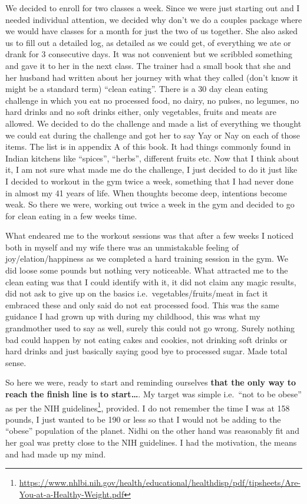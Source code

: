 \documentclass[
  oneside]{book}
\DeclareRobustCommand{\href}[2]{#2\footnote{\url{#1}}}
\begin{document}
We decided to enroll for two classes a week. Since we were just starting out and I needed individual attention, we decided why don't we do a couples package where we would have classes for a month for just the two of us together. She also asked us to fill out a detailed log, as detailed as we could get, of everything we ate or drank for 3 consecutive days. It was not convenient but we scribbled something and gave it to her in the next class. The trainer had a small book that she and her husband had written about her journey with what they called (don't know it might be a standard term) ``clean eating''. There is a 30 day clean eating challenge in which you eat no processed food, no dairy, no pulses, no legumes, no hard drinks and no soft drinks either, only vegetables, fruits and meats are allowed. We decided to do the challenge and made a list of everything we thought we could eat during the challenge and got her to say Yay or Nay on each of those items. The list is in appendix A of this book. It had things commonly found in Indian kitchens like ``spices'', ``herbs'', different fruits etc. Now that I think about it, I am not sure what made me do the challenge, I just decided to do it just like I decided to workout in the gym twice a week, something that I had never done in almost my 41 years of life. When thoughts become deep, intentions become weak. So there we were, working out twice a week in the gym and decided to go for clean eating in a few weeks time.

What endeared me to the workout sessions was that after a few weeks I noticed both in myself and my wife there was an unmistakable feeling of joy/elation/happiness as we completed a hard training session in the gym. We did loose some pounds but nothing very noticeable. What attracted me to the clean eating was that I could identify with it, it did not claim any magic results, did not ask to give up on the basics i.e.~vegetables/fruits/meat in fact it embraced these and only said do not eat processed food. This was the same guidance I had grown up with during my childhood, this was what my grandmother used to say as well, surely this could not go wrong. Surely nothing bad could happen by not eating cakes and cookies, not drinking soft drinks or hard drinks and just basically saying good bye to processed sugar. Made total sense.

So here we were, ready to start and reminding ourselves \textbf{that the only way to reach the finish line is to start\ldots{}}. My target was simple i.e.~``not to be obese'' as per the \href{https://www.nhlbi.nih.gov/health/educational/healthdisp/pdf/tipsheets/Are-You-at-a-Healthy-Weight.pdf}{NIH guidelines}, provided. I do not remember the time I was at 158 pounds, I just wanted to be 190 or less so that I would not be adding to the ``obese'' population of the planet. Nidhi on the other hand was reasonably fit and her goal was pretty close to the NIH guidelines. I had the motivation, the means and had made up my mind.
\end{document}
